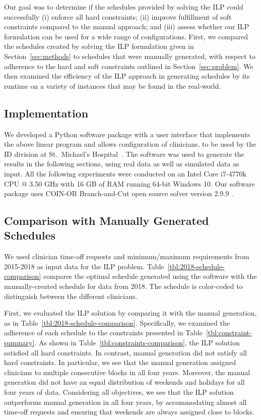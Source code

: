 Our goal was to determine if the schedules provided by solving the ILP 
could successfully
(i) enforce all hard constraints; 
(ii) improve fulfillment of soft constraints compared to the manual approach; 
and (iii) assess whether our ILP formulation can be used for a wide range
of configurations.
First, we compared the schedules created by solving the ILP formulation
given in Section~\ref{sec:methods} to schedules that were manually generated,
with respect to adherence to the hard and soft constraints outlined in Section~\ref{sec:problem}.
We then examined the efficiency of the ILP approach in generating schedules
by its runtime on a variety of instances that may be found in the real-world.

\subsection{Implementation}
We developed a Python software package with a user interface that implements the above
linear program and allows configuration of clinicians, to be
used by the ID division at St.\ Michael's Hospital~\cite{landsman_scheduling}. 
The software was used to
generate the results in the following sections, using real data as well as
simulated data as input. All the following experiments were conducted on an
Intel Core i7-4770k CPU @ 3.50 GHz with 16 GB of RAM running 64-bit Windows 10.
Our software package uses COIN-OR Branch-and-Cut open source solver
version 2.9.9~\cite{johnjforrest_coin-or/cbc:_2019}.

\subsection{Comparison with Manually Generated Schedules}
We used clinician time-off requests and minimum/maximum requirements from
2015-2018 as input data for the ILP problem.
Table~\ref{tbl:2018-schedule-comparison} compares the optimal schedule generated using
the software with the manually-created schedule for data from 2018. The
schedule is color-coded to distinguish between the different clinicians.



First, we evaluated the ILP solution by comparing it with the
manual generation, as in Table~\ref{tbl:2018-schedule-comparison}. Specifically, we examined the adherence of each
schedule to the constraints presented in Table~\ref{tbl:constraint-summary}. As
shown in Table~\ref{tbl:constraints-comparison}, the ILP solution satisfied all 
hard constraints. In contrast,
manual generation did not satisfy all hard constraints. In
particular, we see that the manual generation assigned clinicians to multiple
consecutive blocks in all four years. Moreover, the manual generation did not have
an equal distribution of weekends and holidays for all four years of data.
Considering all objectives, we see that the ILP solution outperforms manual generation
in all four years, by accommodating almost all time-off requests and
ensuring that weekends are always assigned close to blocks.

